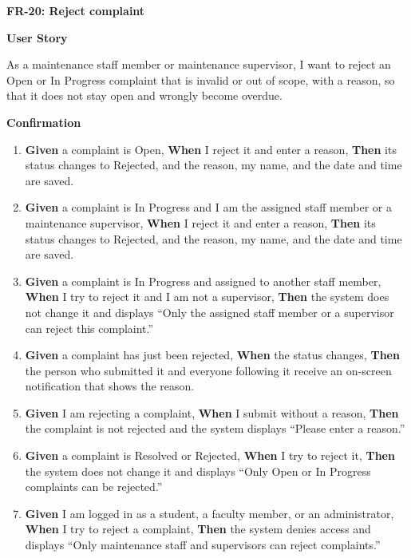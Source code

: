 \noindent\textbf{FR-20: Reject complaint}\par\nopagebreak[4]\smallskip
\noindent\textbf{User Story}\par\nopagebreak[4]
\noindent As a maintenance staff member or maintenance supervisor, I want to reject an Open or In Progress complaint that is invalid or out of scope, with a reason, so that it does not stay open and wrongly become overdue.\par\smallskip
{\makeatletter
{}
\makeatother
\noindent\textbf{Confirmation}\par\nopagebreak[4]\vspace{-6pt}\nopagebreak[4]
\begin{enumerate}\setlength{\itemsep}{2pt}\setlength{\parsep}{0pt}\setlength{\topsep}{2pt}\setlength{\partopsep}{0pt}
  \item \textbf{Given} a complaint is Open, \textbf{When} I reject it and enter a reason, \textbf{Then} its status changes to Rejected, and the reason, my name, and the date and time are saved.
  \item \textbf{Given} a complaint is In Progress and I am the assigned staff member or a maintenance supervisor, \textbf{When} I reject it and enter a reason, \textbf{Then} its status changes to Rejected, and the reason, my name, and the date and time are saved.
  \item \textbf{Given} a complaint is In Progress and assigned to another staff member, \textbf{When} I try to reject it and I am not a supervisor, \textbf{Then} the system does not change it and displays ``Only the assigned staff member or a supervisor can reject this complaint.''
  \item \textbf{Given} a complaint has just been rejected, \textbf{When} the status changes, \textbf{Then} the person who submitted it and everyone following it receive an on-screen notification that shows the reason.
  \item \textbf{Given} I am rejecting a complaint, \textbf{When} I submit without a reason, \textbf{Then} the complaint is not rejected and the system displays ``Please enter a reason.''
  \item \textbf{Given} a complaint is Resolved or Rejected, \textbf{When} I try to reject it, \textbf{Then} the system does not change it and displays ``Only Open or In Progress complaints can be rejected.''
  \item \textbf{Given} I am logged in as a student, a faculty member, or an administrator, \textbf{When} I try to reject a complaint, \textbf{Then} the system denies access and displays ``Only maintenance staff and supervisors can reject complaints.''
\end{enumerate}}
\medskip
 
